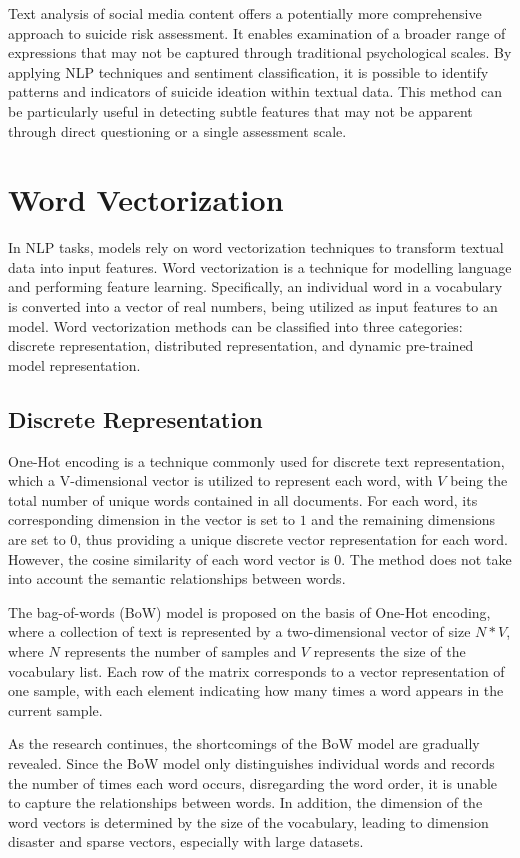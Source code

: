 \documentclass[ %
                    author={Bocheng Wang},
                supervisor={Dr. Qiang Liu},
                    degree={MSc},
                     title={A Research on Identification of Suicide Ideation in Texts with Multiple Models},
                      type={},
                      year={2024}]{dissertation}
\begin{document}
Text analysis of social media content offers a potentially more comprehensive approach to suicide risk assessment. It enables examination of a broader range of expressions that may not be captured through traditional psychological scales. By applying NLP techniques and sentiment classification, it is possible to identify patterns and indicators of suicide ideation within textual data. This method can be particularly useful in detecting subtle features that may not be apparent through direct questioning or a single assessment scale.

\section{Word Vectorization}
\noindent
In NLP tasks, models rely on word vectorization techniques to transform textual data into input features. Word vectorization is a technique for modelling language and performing feature learning. Specifically, an individual word in a vocabulary is converted into a vector of real numbers, being utilized as input features to an model. Word vectorization methods can be classified into three categories: discrete representation, distributed representation, and dynamic pre-trained model representation.

\subsection{Discrete Representation}
\noindent
One-Hot encoding\cite{chren1998one} is a technique commonly used for discrete text representation, which a V-dimensional vector is utilized to represent each word, with $V$ being the total number of unique words contained in all documents. For each word, its corresponding dimension in the vector is set to $1$ and the remaining dimensions are set to $0$, thus providing a unique discrete vector representation for each word. However, the cosine similarity of each word vector is $0$. The method does not take into account the semantic relationships between words. 

The bag-of-words (BoW) model is proposed on the basis of One-Hot encoding, where a collection of text is represented by a two-dimensional vector of size $N \ast V$, where $N$ represents the number of samples and $V$ represents the size of the vocabulary list. Each row of the matrix corresponds to a vector representation of one sample, with each element indicating how many times a word appears in the current sample. 

As the research continues, the shortcomings of the BoW model are gradually revealed. Since the BoW model only distinguishes individual words and records the number of times each word occurs, disregarding the word order, it is unable to capture the relationships between words\cite{suresh2017multilevel}. In addition, the dimension of the word vectors is determined by the size of the vocabulary, leading to dimension disaster\cite{bengio2013representation} and sparse vectors, especially with large datasets.
\end{document}
